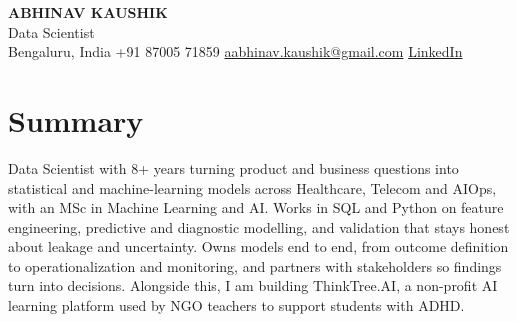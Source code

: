 \documentclass[10pt,a4paper]{article}
\begin{document}
\begin{center}
  {\LARGE\bfseries ABHINAV KAUSHIK}\\[2pt]
  {\large Data Scientist}\\[2pt]
  Bengaluru, India \textbar{} +91 87005 71859 \textbar{} \href{mailto:aabhinav.kaushik@gmail.com}{aabhinav.kaushik@gmail.com} \textbar{} \href{https://www.linkedin.com/in/abhinav-kaushik10/}{LinkedIn}  
\end{center}

\section{Summary}
Data Scientist with 8+ years turning product and business questions into statistical and machine-learning models across Healthcare, Telecom and AIOps, with an MSc in Machine Learning and AI. Works in SQL and Python on feature engineering, predictive and diagnostic modelling, and validation that stays honest about leakage and uncertainty. Owns models end to end, from outcome definition to operationalization and monitoring, and partners with stakeholders so findings turn into decisions. Alongside this, I am building ThinkTree.AI, a non-profit AI learning platform used by NGO teachers to support students with ADHD.
\end{document}

